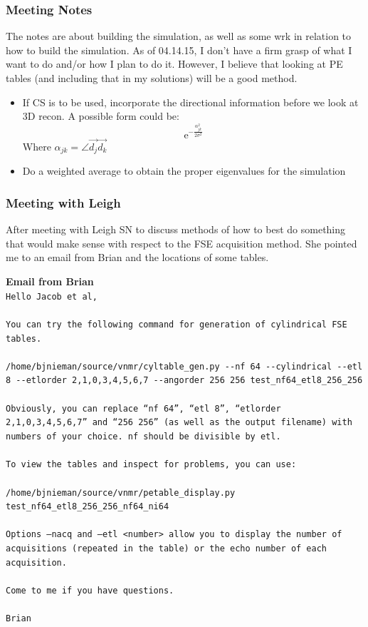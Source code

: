 \documentclass[11 pt]{article}
\newcommand{\me}{\mathrm{e}}
\newcommand{\bo}{\noindent\textbf}
\begin{document}
    \subsubsection{Meeting Notes}
      The notes are about building the simulation, as well as some wrk in relation to how to build the simulation. As of 04.14.15, I don't have a firm grasp of what I want to do and/or how I plan to do it. However, I believe that looking at PE tables (and including that in my solutions) will be a good method.
      \begin{itemize}
	  \item If CS is to be used, incorporate the directional information before we look at 3D recon. A possible form could be:\\
		\[ \me^{-\frac{\alpha_{jk}^2}{2\sigma^2}}\]
		Where $\alpha_{jk} = \angle\vec{d_j}\vec{d_k}$
	  \item Do a weighted average to obtain the proper eigenvalues for the simulation \\
      \end{itemize}
    
    \subsubsection{Meeting with Leigh}
      After meeting with Leigh SN to discuss methods of how to best do something that would make sense with respect to the FSE acquisition method. She pointed me to an email from Brian and the locations of some tables. 
      
      \bo{Email from Brian}\\
	\texttt{Hello Jacob et al,}\\\\
	  \texttt{You can try the following command for generation of cylindrical FSE tables.}\\\\
	   \verb!/home/bjnieman/source/vnmr/cyltable_gen.py --nf 64 --cylindrical --etl 8 --etlorder 2,1,0,3,4,5,6,7 --angorder 256 256 test_nf64_etl8_256_256!\\\\
	    \texttt{Obviously, you can replace “nf 64”, “etl 8”, “etlorder 2,1,0,3,4,5,6,7” and “256 256” (as well as the output filename) with numbers of your choice. nf should be divisible by etl.}\\\\
	    \texttt{To view the tables and inspect for problems, you can use:}\\\\
	    \verb!/home/bjnieman/source/vnmr/petable_display.py test_nf64_etl8_256_256_nf64_ni64!\\\\
	    \texttt{Options —nacq and —etl <number> allow you to display the number of acquisitions (repeated in the table) or the echo number of each acquisition.}\\\\
	    \texttt{Come to me if you have questions.}\\\\
	\texttt{Brian}\\\\
\end{document}
